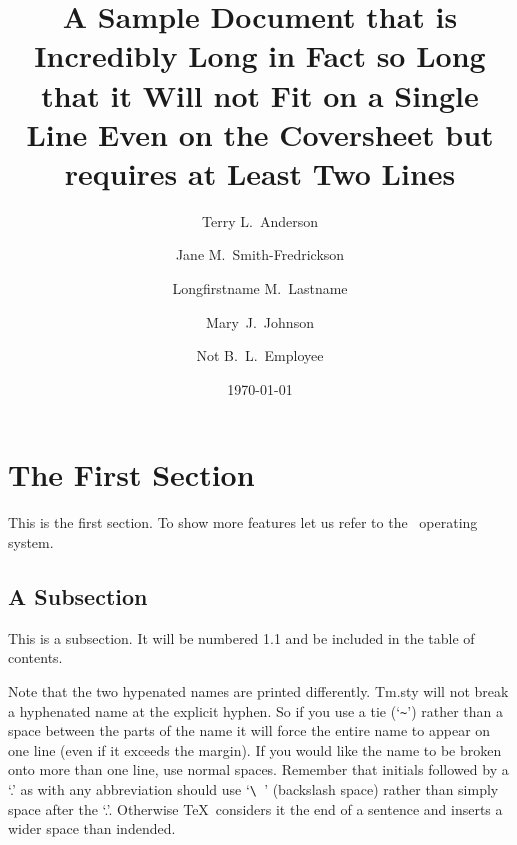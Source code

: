 %
%
\markdraft*
\markrestricted
{}
\itdsrestrict
\title{A Sample Document that is Incredibly Long in Fact so Long that
it Will not Fit on a Single Line Even on the Coversheet but requires
at Least Two Lines}
\author{Terry L.\ Anderson}
\author{Jane M.\ Smith-Fredrickson}
\author{Longfirstname M.\ Lastname}
\author{Mary~J.~Johnson}
\author{Not B.\ L.\ Employee}

\date{\today}

\makehead
\makeabstract
\section{The First Section}
This is the first section.  To show more features let us refer to
the \UNIX\ operating system.
\subsection{A Subsection}
This is a subsection.  It will be numbered 1.1 and be included in
the table of contents.

Note that the two hypenated names are printed differently.  Tm.sty
will not break a hyphenated name at the explicit hyphen.  So if you
use a tie (`\verb|~|') rather than a space between the parts of the
name it will force the entire name to appear on one line (even if it
exceeds the margin).  If you would like the name to be broken onto
more than one line, use normal spaces.  Remember that initials
followed by a `.' as with any abbreviation should use `\verb|\ |'
(backslash space) rather than simply space after the `.'.  Otherwise
\TeX\ considers it the end of a sentence and inserts a wider space
than indended.

